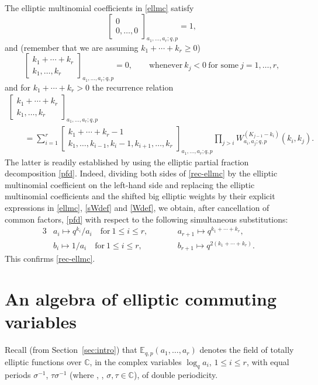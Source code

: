 \documentclass[10pt,a4paper]{amsart}
\numberwithin{equation}{section}
\theoremstyle{definition}
\newcommand{\C}{\mathbb C}
\newcommand{\E}{\mathbb E}
\begin{document}
The elliptic multinomial coefficients in \eqref{ellmc} satisfy
\[
 \begin{bmatrix}0\\0,\dots,0\end{bmatrix}_{a_1,\dots,a_r;q,p}
=1,
\]
and (remember that we are assuming $k_1+\cdots+k_r\ge 0$)
\[
 \begin{bmatrix}k_1+\cdots+k_r\\k_1,\dots,k_r\end{bmatrix}_{a_1,\dots,a_r;q,p}
=0,\qquad\text{whenever} \ k_j<0 \ \text{for some} \ j=1,\dots,r,
\]
and for $k_1+\cdots+k_r>0$
the recurrence relation
\begin{gather}
\begin{bmatrix}k_1+\cdots+k_r\\
 k_1,\dots,k_r\end{bmatrix}_{a_1,\dots,a_r;q,p}\nonumber\\
 \qquad=\sum_{i=1}^r
 \begin{bmatrix}k_1+\cdots+k_r-1\\k_1,\dots,k_{i-1},k_i-1,
 k_{i+1},\dots,k_r\end{bmatrix}_{a_1,\dots,a_r;q,p}
 \prod_{j>i}W_{a_i,a_j;q,p}^{(K_{j-1}-k_i)}(k_i,k_j).\label{rec-ellmc}
\end{gather}
The latter is readily established by using the elliptic
partial fraction decomposition \eqref{pfd}.
Indeed, dividing both sides of \eqref{rec-ellmc} by
the elliptic multinomial coefficient on the left-hand side and
replacing the elliptic multinomial coefficients and the shifted big
elliptic weights by their explicit expressions in \eqref{ellmc},
\eqref{sWdef} and \eqref{Wdef}, we obtain, after cancellation
of common factors, \eqref{pfd} with respect to the following simultaneous substitutions:
\begin{alignat*}{3}
 & a_i\mapsto q^{k_i}/a_i\quad\text{for}\ 1\le i\le r,\qquad&&
 a_{r+1}\mapsto q^{k_1+\cdots+k_r},&\\
 & b_i\mapsto 1/a_i\quad\text{for}\ 1\le i\le r,\qquad&&
 b_{r+1}\mapsto q^{2(k_1+\cdots+k_r)}.&
\end{alignat*}
This confirms \eqref{rec-ellmc}.

\section{An algebra of elliptic commuting variables}\label{sec:ellalg}

Recall (from Section~\ref{sec:intro})
that $\E_{q,p}(a_1,\dots,a_r)$
denotes the field of totally
elliptic functions over $\C$, in the complex variables
$\log_qa_i$, $1\le i\le r$, with equal periods $\sigma^{-1}$,
$\tau\sigma^{-1}$ (where , ,
$\sigma,\tau\in\C$), of double periodicity.
\end{document}
